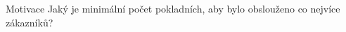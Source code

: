 \begin{frame}{Motivace}
	Jaký je minimální počet pokladních, 
    aby bylo obslouženo co nejvíce zákazníků?
\end{frame}



